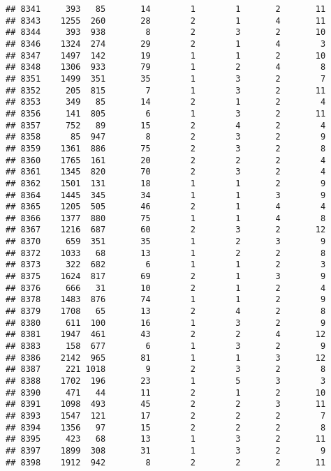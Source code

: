 \documentclass[]{article}
\begin{document}
\begin{verbatim}
## 8341     393   85       14        1        1       2       11
## 8343    1255  260       28        2        1       4       11
## 8344     393  938        8        2        3       2       10
## 8346    1324  274       29        2        1       4        3
## 8347    1497  142       19        1        1       2       10
## 8348    1306  933       79        1        2       4        8
## 8351    1499  351       35        1        3       2        7
## 8352     205  815        7        1        3       2       11
## 8353     349   85       14        2        1       2        4
## 8356     141  805        6        1        3       2       11
## 8357     752   89       15        2        4       2        4
## 8358      85  947        8        2        3       2        9
## 8359    1361  886       75        2        3       2        8
## 8360    1765  161       20        2        2       2        4
## 8361    1345  820       70        2        3       2        4
## 8362    1501  131       18        1        1       2        9
## 8364    1445  345       34        1        1       3        9
## 8365    1205  505       46        2        1       4        4
## 8366    1377  880       75        1        1       4        8
## 8367    1216  687       60        2        3       2       12
## 8370     659  351       35        1        2       3        9
## 8372    1033   68       13        1        2       2        8
## 8373     322  682        6        1        1       2        3
## 8375    1624  817       69        2        1       3        9
## 8376     666   31       10        2        1       2        4
## 8378    1483  876       74        1        1       2        9
## 8379    1708   65       13        2        4       2        8
## 8380     611  100       16        1        3       2        9
## 8381    1947  461       43        2        2       4       12
## 8383     158  677        6        1        3       2        9
## 8386    2142  965       81        1        1       3       12
## 8387     221 1018        9        2        3       2        8
## 8388    1702  196       23        1        5       3        3
## 8390     471   44       11        2        1       2       10
## 8391    1098  493       45        2        2       3       11
## 8393    1547  121       17        2        2       2        7
## 8394    1356   97       15        2        2       2        8
## 8395     423   68       13        1        3       2       11
## 8397    1899  308       31        1        3       2        9
## 8398    1912  942        8        2        2       2       11

\end{verbatim}
\end{document}
